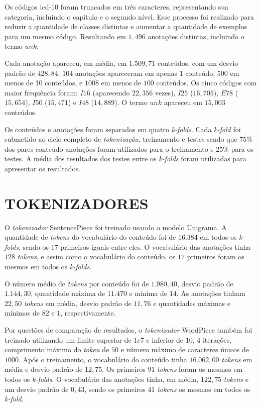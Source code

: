 Os códigos \gls{icd}-10 foram truncados em três caracteres, representando sua categoria, incluindo o capítulo e o segundo nível. Esse processo foi realizado para reduzir a quantidade de classes distintas e aumentar a quantidade de exemplos para um mesmo código. Resultando em $1,496$ anotações distintas, incluindo o termo $unk$.

Cada anotação apareceu, em média, em $1.509,71$ conteúdos, com um desvio padrão de $428,84$. $104$ anotações apareceram em apenas 1 conteúdo, $500$ em menos de 10 conteúdos, e $1008$ em menos de $100$ conteúdos. Os cinco códigos com maior frequência foram: $I16$ (aparecendo $22,356$ vezes), $I25$ ($16,705$), $E78$ ($15,654$), $I50$ ($15,471$) e $I48$ ($14,889$). O termo $unk$ apareceu em $15,003$ conteúdos.

Os conteúdos e anotações foram separados em quatro \textit{k-folds}. Cada \textit{k-fold} foi submetido ao ciclo completo de \textit{tokenização}, treinamento e testes sendo que $75\%$ dos pares conteúdo-anotações foram utilizados para o treinamento e $25\%$ para os testes. A média dos resultados dos testes entre os \textit{k-folds} foram utilizadas para apresentar os resultados.

\section{TOKENIZADORES}
\label{sec:results-tokenizers}

O \textit{tokenizador} SentencePiece foi treinado usando o modelo Unigrama. A quantidade de \textit{tokens} do vocabulário do conteúdo foi de $16.384$ em todos os \textit{k-folds}, sendo os $17$ primeiros iguais entre eles. O vocabulário das anotações tinha $128$ \textit{tokens}, e assim como o vocabulário do conteúdo, os $17$ primeiros foram os mesmos em todos os \textit{k-folds}.

O número médio de \textit{tokens} por conteúdo foi de $1.980,40$, desvio padrão de $1.144,30$, quantidade máxima de $11.470$ e mínima de $14$. As anotações tinham $22,50$ \textit{tokens} em média, desvio padrão de $11,76$ e quantidades máximas e mínimas de $82$ e $1$, respectivamente. 

Por questões de comparação de resultados, o \textit{tokenizador} WordPiece também foi treinado utilizando um limite superior de $1e7$ e inferior de $10$, $4$ iterações, comprimento máximo do \textit{token} de $50$ e número máximo de caracteres únicos de $1000$. Após o treinamento, o vocabulário do conteúdo tinha $16.062,00$ \textit{tokens} em média e desvio padrão de $12,75$. Os primeiros $91$ \textit{tokens} foram os mesmos em todos os \textit{k-folds}. O vocabulário das anotações tinha, em média, $122,75$ \textit{tokens} e um desvio padrão de $0,43$, sendo os primeiros $41$ \textit{tokens} os mesmos em todos os \textit{k-fold}.  

